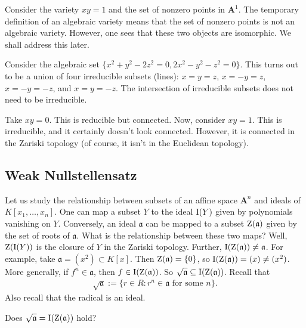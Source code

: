 \documentclass [11 pt, oneside, margin = 1 in] {article}
\begin{document}
\begin{example}[ ]\label{}\text{}
Consider the variety $xy=1$ and the set of nonzero points in $\mathbf{A}^1$. The temporary definition of an algebraic variety means that the set of nonzero points is not an algebraic variety. However, one sees that these two objects are isomorphic. We shall address this later.
\end{example}

\begin{example}[ ]\label{}\text{}
Consider the algebraic set $\{x^2+y^2 -2z^2=0, 2x^2 - y^2 - z^2=0\}$. This turns out to be a union of four irreducible subsets (lines): $x=y=z$, $x=-y=z$, $x=-y=-z$, and $x=y=-z$. The intersection of irreducible subsets does not need to be irreducible.
\end{example}

\begin{example}[ ]\label{}\text{}
Take $xy=0$. This is reducible but connected. Now, consider $xy=1$. This is irreducible, and it certainly doesn't look connected. However, it is connected in the Zariski topology (of course, it isn't in the Euclidean topology).
\end{example}


\subsection{Weak Nullstellensatz}
Let us study the relationship between subsets of an affine space $\mathbf{A}^n$ and ideals of $K[x_1,\hdots, x_n]$. One can map a subset $Y$ to the ideal $\operatorname{I}(Y)$ given by polynomials vanishing on $Y$. Conversely, an ideal $\mathfrak{a}$ can be mapped to a subset $\operatorname{Z}(\mathfrak a)$ given by the set of roots of $\mathfrak{a}$. What is the relationship between these two maps? Well, $\operatorname{Z}(\operatorname{I}(Y))$ is the closure of $Y$ in the Zariski topology. Further, $\operatorname{I}(\operatorname{Z}(\mathfrak{a}))\ne \mathfrak{a}$. For example, take $\mathfrak{a}=(x^2)\subset K[x]$. Then $\operatorname{Z}(\mathfrak{a}) = \{0\}$, so $\operatorname{I}(\operatorname{Z}(\mathfrak{a})) =(x)\ne (x^2)$. More generally, if $f^n\in \mathfrak{a}$, then $f\in \operatorname{I}(\operatorname{Z}(\mathfrak a))$. So $\sqrt{\mathfrak{a}} \subseteq \operatorname{I}(\operatorname{Z}(\mathfrak{a}))$. Recall that
\begin{align*}
	\sqrt{\mathfrak{a}} := \{ r\in R : r^n \in \mathfrak{a} \textrm{ for some $n$}\}.
\end{align*}
Also recall that the radical is an ideal.

\begin{problem}
	Does $\sqrt{\mathfrak{a}}= \operatorname{I}(\operatorname{Z}(\mathfrak{a})) $ hold?
\end{problem}
\end{document}
